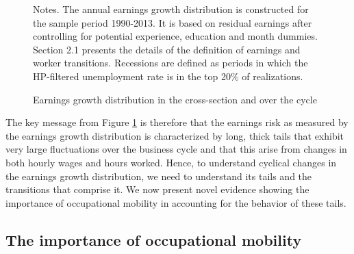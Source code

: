 \documentclass[12pt]{article}
\theoremstyle{definition}
\begin{document}
\begin{figure}[H]
    \noindent\caption{Earnings growth distribution in the cross-section and over the cycle}
    \begin{center}
    \end{center}
    \vspace{-20pt}
    {\footnotesize Notes. The annual earnings growth distribution is constructed for the sample period 1990-2013. It is based on residual earnings after controlling for potential experience, education and month dummies. Section 2.1 presents the details of the definition of earnings and worker transitions. Recessions are defined as periods in which the HP-filtered unemployment rate is in the top 20\% of realizations.}
    \label{carrillo-tudelaCyclicalEarningsCareer2022_fig1}
\end{figure}


The key message from Figure \ref{carrillo-tudelaCyclicalEarningsCareer2022_fig1} is therefore that the earnings risk as measured by the earnings growth distribution is characterized by long, thick tails that exhibit very large fluctuations over the business cycle and that this arise from changes in both hourly wages and hours worked. Hence, to understand cyclical changes in the earnings growth distribution, we need to understand its tails and the transitions that comprise it. We now present novel evidence showing the importance of occupational mobility in accounting for the behavior of these tails.

\subsection{The importance of occupational mobility}
\end{document}
